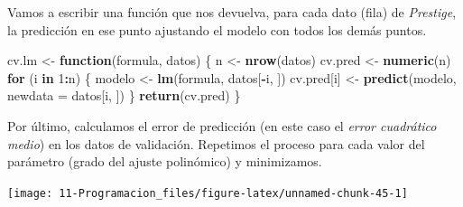 \documentclass[]{book}
\newenvironment{Shaded}{\begin{snugshade}}{\end{snugshade}}
\newcommand{\ControlFlowTok}[1]{\textcolor[rgb]{0.13,0.29,0.53}{\textbf{#1}}}
\newcommand{\DataTypeTok}[1]{\textcolor[rgb]{0.13,0.29,0.53}{#1}}
\newcommand{\DecValTok}[1]{\textcolor[rgb]{0.00,0.00,0.81}{#1}}
\newcommand{\KeywordTok}[1]{\textcolor[rgb]{0.13,0.29,0.53}{\textbf{#1}}}
\newcommand{\NormalTok}[1]{#1}
\newcommand{\OperatorTok}[1]{\textcolor[rgb]{0.81,0.36,0.00}{\textbf{#1}}}
\newcommand{\StringTok}[1]{\textcolor[rgb]{0.31,0.60,0.02}{#1}}
\begin{document}
Vamos a escribir una función que nos devuelva, para cada dato (fila) de
\emph{Prestige}, la predicción en ese punto ajustando el modelo con todos los demás puntos.

\begin{Shaded}
\begin{Highlighting}[]
\NormalTok{cv.lm <-}\StringTok{ }\ControlFlowTok{function}\NormalTok{(formula, datos) \{}
\NormalTok{      n <-}\StringTok{ }\KeywordTok{nrow}\NormalTok{(datos)}
\NormalTok{      cv.pred <-}\StringTok{ }\KeywordTok{numeric}\NormalTok{(n)}
      \ControlFlowTok{for}\NormalTok{ (i }\ControlFlowTok{in} \DecValTok{1}\OperatorTok{:}\NormalTok{n) \{}
\NormalTok{          modelo <-}\StringTok{ }\KeywordTok{lm}\NormalTok{(formula, datos[}\OperatorTok{-}\NormalTok{i, ])}
\NormalTok{          cv.pred[i] <-}\StringTok{ }\KeywordTok{predict}\NormalTok{(modelo, }\DataTypeTok{newdata =}\NormalTok{ datos[i, ])}
\NormalTok{      \}}
      \KeywordTok{return}\NormalTok{(cv.pred)}
\NormalTok{\}}
\end{Highlighting}
\end{Shaded}

Por último, calculamos el error de predicción (en este caso el \emph{error cuadrático medio})
en los datos de validación. Repetimos el proceso para cada valor del parámetro (grado del
ajuste polinómico) y minimizamos.

\begin{Shaded}
\end{Shaded}

\begin{center}\texttt{[image: 11-Programacion\_files/figure-latex/unnamed-chunk-45-1]} \end{center}
\end{document}
